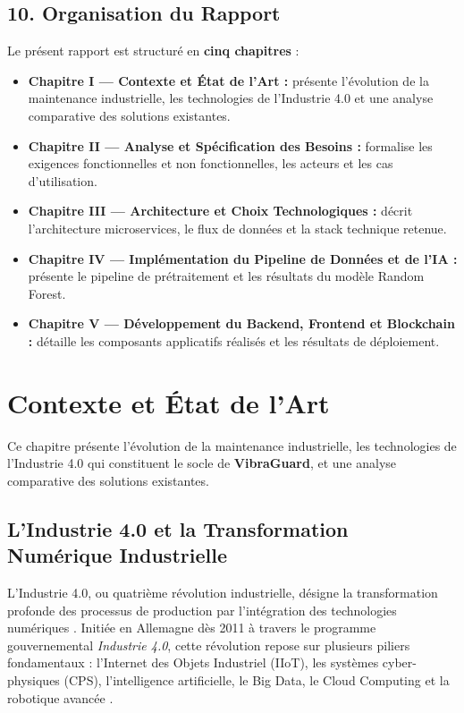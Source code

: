 \documentclass[12pt, a4paper, oneside]{report}
\newcommand{\projectname}{\textbf{VibraGuard}}
\begin{document}
\section*{10. Organisation du Rapport}

Le présent rapport est structuré en \textbf{cinq chapitres} :

\begin{itemize}
  \item \textbf{Chapitre I --- Contexte et État de l'Art :} présente l'évolution de la
  maintenance industrielle, les technologies de l'Industrie 4.0 et une analyse comparative
  des solutions existantes.
  \item \textbf{Chapitre II --- Analyse et Spécification des Besoins :} formalise les
  exigences fonctionnelles et non fonctionnelles, les acteurs et les cas d'utilisation.
  \item \textbf{Chapitre III --- Architecture et Choix Technologiques :} décrit
  l'architecture microservices, le flux de données et la stack technique retenue.
  \item \textbf{Chapitre IV --- Implémentation du Pipeline de Données et de l'IA :}
  présente le pipeline de prétraitement et les résultats du modèle Random Forest.
  \item \textbf{Chapitre V --- Développement du Backend, Frontend et Blockchain :}
  détaille les composants applicatifs réalisés et les résultats de déploiement.
\end{itemize}

\chapter{Contexte et État de l'Art}

Ce chapitre présente l'évolution de la maintenance industrielle, les technologies de l'Industrie 4.0 qui constituent le socle de \projectname{}, et une analyse comparative des solutions existantes.

\section{L'Industrie 4.0 et la Transformation Numérique Industrielle}

L'Industrie 4.0, ou quatrième révolution industrielle, désigne la transformation profonde des
processus de production par l'intégration des technologies numériques \cite{schwab2016}.
Initiée en Allemagne dès 2011 à travers le programme gouvernemental \textit{Industrie 4.0},
cette révolution repose sur plusieurs piliers fondamentaux : l'Internet des Objets Industriel
(IIoT), les systèmes cyber-physiques (CPS), l'intelligence artificielle, le Big Data, le Cloud
Computing et la robotique avancée \cite{hermann2016}.
\end{document}
